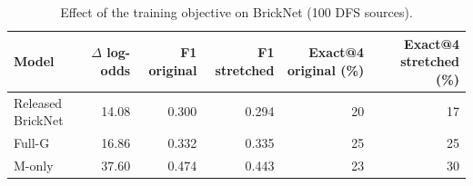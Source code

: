 \begin{table}[htbp]
\centering\small
\caption{Effect of the training objective on BrickNet (100 DFS sources).}
\begin{tabular}{@{}lrrrrr@{}}\toprule
Model & $\Delta$ log-odds & F1 original & F1 stretched & Exact@4 original (\%) & Exact@4 stretched (\%) \\
\midrule
Released BrickNet & 14.08 & 0.300 & 0.294 & 20 & 17 \\
Full-G & 16.86 & 0.332 & 0.335 & 25 & 25 \\
M-only & 37.60 & 0.474 & 0.443 & 23 & 30 \\
\bottomrule\end{tabular}
\end{table}
